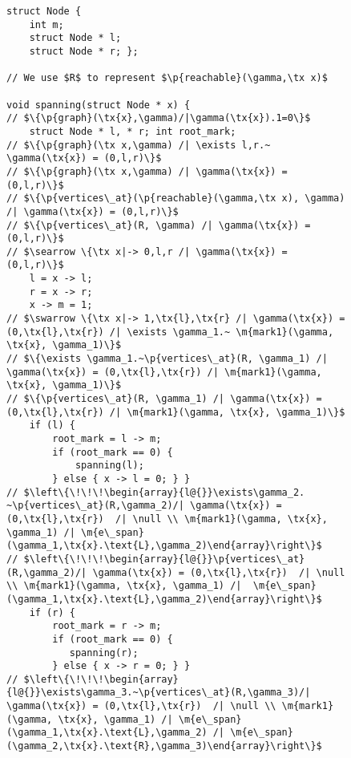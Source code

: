 \begin{figure}[htbp]
  \begin{lstlisting}
struct Node {
    int m;
    struct Node * l;
    struct Node * r; };

// We use $R$ to represent $\p{reachable}(\gamma,\tx x)$

void spanning(struct Node * x) { 
// $\{\p{graph}(\tx{x},\gamma)/|\gamma(\tx{x}).1=0\}$ 
    struct Node * l, * r; int root_mark;
// $\{\p{graph}(\tx x,\gamma) /| \exists l,r.~ \gamma(\tx{x}) = (0,l,r)\}$
// $\{\p{graph}(\tx x,\gamma) /| \gamma(\tx{x}) = (0,l,r)\}$
// $\{\p{vertices\_at}(\p{reachable}(\gamma,\tx x), \gamma) /| \gamma(\tx{x}) = (0,l,r)\}$
// $\{\p{vertices\_at}(R, \gamma) /| \gamma(\tx{x}) = (0,l,r)\}$
// $\searrow \{\tx x|-> 0,l,r /| \gamma(\tx{x}) = (0,l,r)\}$
    l = x -> l;
    r = x -> r;
    x -> m = 1;
// $\swarrow \{\tx x|-> 1,\tx{l},\tx{r} /| \gamma(\tx{x}) = (0,\tx{l},\tx{r}) /| \exists \gamma_1.~ \m{mark1}(\gamma, \tx{x}, \gamma_1)\}$
// $\{\exists \gamma_1.~\p{vertices\_at}(R, \gamma_1) /| \gamma(\tx{x}) = (0,\tx{l},\tx{r}) /| \m{mark1}(\gamma, \tx{x}, \gamma_1)\}$
// $\{\p{vertices\_at}(R, \gamma_1) /| \gamma(\tx{x}) = (0,\tx{l},\tx{r}) /| \m{mark1}(\gamma, \tx{x}, \gamma_1)\}$
    if (l) {
        root_mark = l -> m;
        if (root_mark == 0) {
            spanning(l);
        } else { x -> l = 0; } }
// $\left\{\!\!\!\begin{array}{l@{}}\exists\gamma_2. ~\p{vertices\_at}(R,\gamma_2)/| \gamma(\tx{x}) = (0,\tx{l},\tx{r})  /| \null \\ \m{mark1}(\gamma, \tx{x}, \gamma_1) /| \m{e\_span}(\gamma_1,\tx{x}.\text{L},\gamma_2)\end{array}\right\}$
// $\left\{\!\!\!\begin{array}{l@{}}\p{vertices\_at}(R,\gamma_2)/| \gamma(\tx{x}) = (0,\tx{l},\tx{r})  /| \null \\ \m{mark1}(\gamma, \tx{x}, \gamma_1) /|  \m{e\_span}(\gamma_1,\tx{x}.\text{L},\gamma_2)\end{array}\right\}$
    if (r) {
        root_mark = r -> m;
        if (root_mark == 0) {
           spanning(r);
        } else { x -> r = 0; } }
// $\left\{\!\!\!\begin{array}{l@{}}\exists\gamma_3.~\p{vertices\_at}(R,\gamma_3)/| \gamma(\tx{x}) = (0,\tx{l},\tx{r})  /| \null \\ \m{mark1}(\gamma, \tx{x}, \gamma_1) /| \m{e\_span}(\gamma_1,\tx{x}.\text{L},\gamma_2) /| \m{e\_span}(\gamma_2,\tx{x}.\text{R},\gamma_3)\end{array}\right\}$

\end{lstlisting}
\end{figure}
